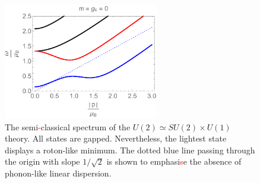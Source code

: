   \begin{figure}[h]
\begin{center}
\includegraphics[height=2.0in]{Chapter_3_Folder_1806.06976/figures/u2.pdf}
\end{center}
      \caption[This figure shows the semi\textcolor{red}{-}classical spectrum of the $U(2)\simeq SU(2)\times U(1)$ theory.]{ \small{The semi\textcolor{red}{-}classical spectrum of the $U(2)\simeq SU(2)\times U(1)$ theory. All states are gapped. Nevertheless, the lightest state displays a roton-like minimum. The dotted blue line passing through the origin with slope $1/\sqrt 2$ is shown to emphasi\textcolor{red}{s}e the absence of  phonon-like linear dispersion.}}
\label{u2}
\end{figure}

 
